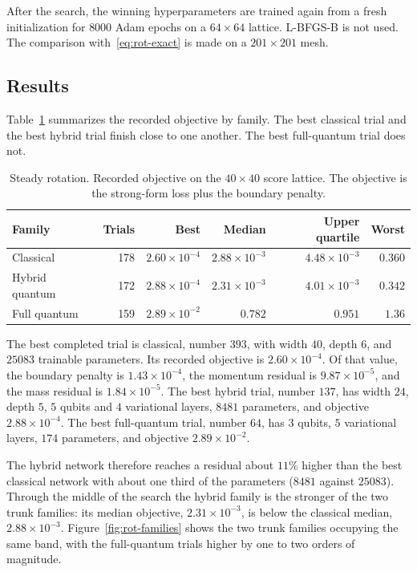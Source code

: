 \documentclass[11pt]{article}
\begin{document}
After the search, the winning hyperparameters are trained again from a fresh initialization for \(8000\) Adam epochs on a \(64\times 64\) lattice. L-BFGS-B is not used. The comparison with~\eqref{eq:rot-exact} is made on a \(201\times 201\) mesh.

\subsection{Results}
\label{sec:rotation-results}

Table~\ref{tab:rot-spread} summarizes the recorded objective by family. The best classical trial and the best hybrid trial finish close to one another. The best full-quantum trial does not.

\begin{table}[ht]
\centering
\caption{Steady rotation. Recorded objective on the \(40\times 40\) score lattice. The objective is the strong-form loss plus the boundary penalty.}
\label{tab:rot-spread}
\begin{tabular}{lrrrrr}
\toprule
Family & Trials & Best & Median & Upper quartile & Worst \\
\midrule
Classical      & 178 & \(2.60\times 10^{-4}\) & \(2.88\times 10^{-3}\) & \(4.48\times 10^{-3}\) & \(0.360\) \\
Hybrid quantum & 172 & \(2.88\times 10^{-4}\) & \(2.31\times 10^{-3}\) & \(4.01\times 10^{-3}\) & \(0.342\) \\
Full quantum   & 159 & \(2.89\times 10^{-2}\) & \(0.782\)            & \(0.951\)            & \(1.36\) \\
\bottomrule
\end{tabular}
\end{table}

The best completed trial is classical, number \(393\), with width \(40\), depth \(6\), and \(25083\) trainable parameters. Its recorded objective is \(2.60\times 10^{-4}\). Of that value, the boundary penalty is \(1.43\times 10^{-4}\), the momentum residual is \(9.87\times 10^{-5}\), and the mass residual is \(1.84\times 10^{-5}\). The best hybrid trial, number \(137\), has width \(24\), depth \(5\), \(5\) qubits and \(4\) variational layers, \(8481\) parameters, and objective \(2.88\times 10^{-4}\). The best full-quantum trial, number \(64\), has \(3\) qubits, \(5\) variational layers, \(174\) parameters, and objective \(2.89\times 10^{-2}\).

The hybrid network therefore reaches a residual about \(11\%\) higher than the best classical network with about one third of the parameters (\(8481\) against \(25083\)). Through the middle of the search the hybrid family is the stronger of the two trunk families: its median objective, \(2.31\times 10^{-3}\), is below the classical median, \(2.88\times 10^{-3}\). Figure~\ref{fig:rot-families} shows the two trunk families occupying the same band, with the full-quantum trials higher by one to two orders of magnitude.
\end{document}
